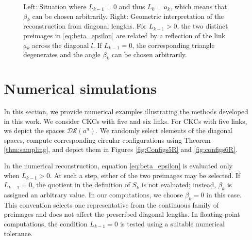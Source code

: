 \documentclass[10pt,a4paper]{article}
\theoremstyle{definition}
\theoremstyle{remark}
\numberwithin{equation}{section}
\begin{document}
\begin{figure}[h!]
\caption{Left: Situation where $L_{k-1} = 0$ and thus $L_k=a_k$, which means that $\beta_k$ can be chosen arbitrarily. Right: Geometric interpretation of the reconstruction from diagonal lengths. For $L_{k-1}>0$, the two distinct preimages in \eqref{eq:beta_epsilon} are related by a reflection of the link $a_k$ across the diagonal $l$. If $L_{k-1}=0$, the corresponding triangle degenerates and the angle $\beta_k$ can be chosen arbitrarily.}
\label{fig:ClosedChain_b}
\end{figure}





\section{Numerical simulations}\label{sec:Appcon}


In this section, we provide numerical examples illustrating the methods developed in this work. We consider CKCs with five and six links. For CKCs with five links, we depict the spaces $\mathcal{DS}(a^n)$. We randomly select elements of the diagonal spaces, compute corresponding circular configurations using Theorem \ref{thm:sampling}, and depict them in Figures \ref{fig:Configs5R} and \ref{fig:configs6R}.

In the numerical reconstruction, equation \eqref{eq:beta_epsilon} is evaluated only when $L_{k-1}>0$. At such a step, either of the two preimages may be selected. If $L_{k-1}=0$, the quotient in the definition of $S_k$ is not evaluated; instead, $\beta_k$ is assigned an arbitrary value. In our computations, we choose $\beta_k=0$ in this case. This convention selects one representative from the continuous family of preimages and does not affect the prescribed diagonal lengths. In floating-point computations, the condition $L_{k-1}=0$ is tested using a suitable numerical tolerance.
\end{document}
